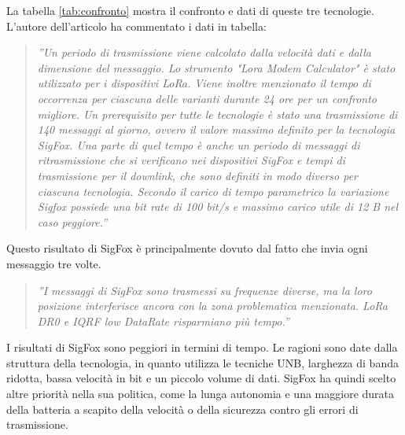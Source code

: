 \documentclass[a4paper]{report} %
\begin{document}
La tabella \ref{tab:confronto} mostra il confronto e dati di queste tre tecnologie. L'autore dell'articolo \cite{art:rif.46} ha commentato i dati in tabella:
\begin{quote}
	\textit{''Un periodo di trasmissione viene calcolato dalla velocità dati e dalla dimensione del messaggio. Lo strumento "Lora Modem Calculator" è stato utilizzato per i dispositivi LoRa. Viene inoltre menzionato il tempo di occorrenza per ciascuna delle varianti durante 24 ore per un confronto migliore. Un prerequisito per tutte le tecnologie è stato una trasmissione di 140 messaggi al giorno, ovvero il valore massimo definito per la tecnologia SigFox. Una parte di quel tempo è anche un periodo di messaggi di ritrasmissione che si verificano nei dispositivi SigFox e tempi di trasmissione per il downlink, che sono definiti in modo diverso per ciascuna tecnologia. Secondo il carico di tempo parametrico la variazione Sigfox possiede una bit rate di 100 bit/s e massimo carico utile di 12 B nel caso peggiore.''}
\end{quote}
Questo risultato di SigFox è principalmente dovuto dal fatto che invia ogni messaggio tre volte. 
\begin{quote}
	\textit{''I messaggi di SigFox sono trasmessi su frequenze diverse, ma la loro posizione interferisce ancora con la zona problematica menzionata. LoRa DR0 e IQRF low DataRate risparmiano più tempo.''}
\end{quote}
I risultati di SigFox sono peggiori in termini di tempo. Le ragioni sono date dalla struttura della tecnologia, in quanto utilizza le tecniche UNB, larghezza di banda ridotta, bassa velocità in bit e un piccolo volume di dati. SigFox ha quindi scelto altre priorità nella sua politica, come la lunga autonomia e una maggiore durata della batteria a scapito della velocità o della sicurezza contro gli errori di trasmissione.
\end{document}
